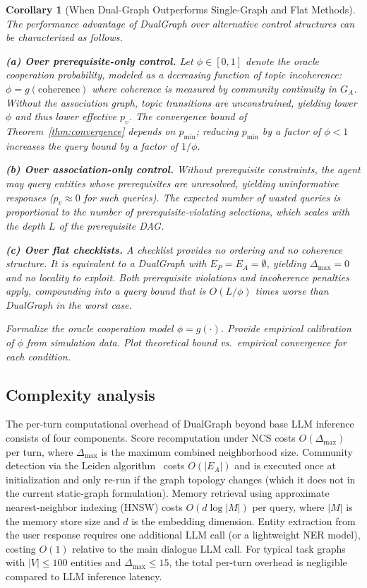 \documentclass[11pt,a4paper]{article}
\newtheorem{corollary}{Corollary}
\newcommand{\placeholder}[1]{%
  \begin{tcolorbox}[colback=yellow!10,colframe=orange!60!black,
    fonttitle=\bfseries,title=Placeholder]
    #1
  \end{tcolorbox}%
}
\begin{document}
\begin{corollary}[When Dual-Graph Outperforms Single-Graph and Flat Methods]
\label{cor:when}
The performance advantage of DualGraph over alternative control structures
can be characterized as follows.

\noindent\textbf{(a) Over prerequisite-only control.} Let $\phi \in [0, 1]$
denote the \emph{oracle cooperation probability}, modeled as a decreasing
function of topic incoherence: $\phi = g(\mathrm{coherence})$ where coherence
is measured by community continuity in $G_A$. Without the association graph,
topic transitions are unconstrained, yielding lower $\phi$ and thus lower
effective $p_v$. The convergence bound of Theorem~\ref{thm:convergence}
depends on $p_{\min}$; reducing $p_{\min}$ by a factor of $\phi < 1$
increases the query bound by a factor of $1/\phi$.

\noindent\textbf{(b) Over association-only control.} Without prerequisite
constraints, the agent may query entities whose prerequisites are unresolved,
yielding uninformative responses ($p_v \approx 0$ for such queries). The
expected number of wasted queries is proportional to the number of
prerequisite-violating selections, which scales with the depth $L$ of the
prerequisite DAG.

\noindent\textbf{(c) Over flat checklists.} A checklist provides no ordering
and no coherence structure. It is equivalent to a DualGraph with
$E_P = E_A = \emptyset$, yielding $\Delta_{\max} = 0$ and no locality to
exploit. Both prerequisite violations and incoherence penalties apply,
compounding into a query bound that is $O(L / \phi)$ times worse than
DualGraph in the worst case.

\placeholder{%
  Formalize the oracle cooperation model $\phi = g(\cdot)$.
  Provide empirical calibration of $\phi$ from simulation data.
  Plot theoretical bound vs.\ empirical convergence for each condition.
}
\end{corollary}

\subsection{Complexity analysis}
\label{sec:theory_complexity}

The per-turn computational overhead of DualGraph beyond base LLM inference
consists of four components. Score recomputation under NCS costs
$O(\Delta_{\max})$ per turn, where $\Delta_{\max}$ is the maximum combined
neighborhood size. Community detection via the Leiden
algorithm~\cite{traag2019leiden} costs $O(|E_A|)$ and is executed once at
initialization and only re-run if the graph topology changes (which it does
not in the current static-graph formulation). Memory retrieval using
approximate nearest-neighbor indexing (HNSW) costs $O(d \log |M|)$ per
query, where $|M|$ is the memory store size and $d$ is the embedding
dimension. Entity extraction from the user response requires one additional
LLM call (or a lightweight NER model), costing $O(1)$ relative to the main
dialogue LLM call. For typical task graphs with $|V| \leq 100$ entities and
$\Delta_{\max} \leq 15$, the total per-turn overhead is negligible compared
to LLM inference latency.
\end{document}
